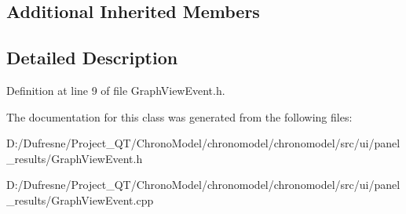 \subsection*{Additional Inherited Members}


\subsection{Detailed Description}


Definition at line 9 of file Graph\-View\-Event.\-h.



The documentation for this class was generated from the following files\-:\begin{DoxyCompactItemize}
\item 
D\-:/\-Dufresne/\-Project\-\_\-\-Q\-T/\-Chrono\-Model/chronomodel/chronomodel/src/ui/panel\-\_\-results/Graph\-View\-Event.\-h\item 
D\-:/\-Dufresne/\-Project\-\_\-\-Q\-T/\-Chrono\-Model/chronomodel/chronomodel/src/ui/panel\-\_\-results/Graph\-View\-Event.\-cpp\end{DoxyCompactItemize}
